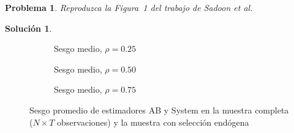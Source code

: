\documentclass[12pt,letterpaper,reqno,oneside]{amsart}
\theoremstyle{problemstyle} %
\newtheorem{problem}{Problema}
\theoremstyle{definition} %
\newtheorem{solution}{Solución}[problem]
\renewcommand{\thesolution}{\theproblem~(\alph{solution})}
\begin{document}
\endgroup
\begin{mdframed}
  \begin{problem}
  \label{prob:2}
  Reproduzca la Figura~1 del trabajo de Sadoon et al.
  \end{problem}
\end{mdframed}
\begingroup
\renewcommand{\thesolution}{\theproblem}
\begin{solution} %
  \label{sol:2}

  \begin{figure}[htbp]
    \centering
    \begin{subfigure}[b]{0.49\textwidth}
      \centering
      \resizebox{\textwidth}{!}{}
      \caption{Sesgo medio, $\rho = 0.25$}
      \label{fig:panel1}
    \end{subfigure}
    \hfill
    \begin{subfigure}[b]{0.49\textwidth}
      \centering
      \resizebox{\textwidth}{!}{}
      \caption{Sesgo medio, $\rho = 0.50$}
      \label{fig:panel2}
    \end{subfigure}
    \vfill
    \begin{subfigure}[b]{0.5\textwidth}
      \centering
      \resizebox{\textwidth}{!}{}
      \caption{Sesgo medio, $\rho = 0.75$}
      \label{fig:panel3}
    \end{subfigure}
    \caption{Sesgo promedio de estimadores AB y System en la muestra completa ($N\times T$ observaciones) y la muestra con selección endógena}
    \label{fig:fig1}
  \end{figure}


\end{solution}
\end{document}
